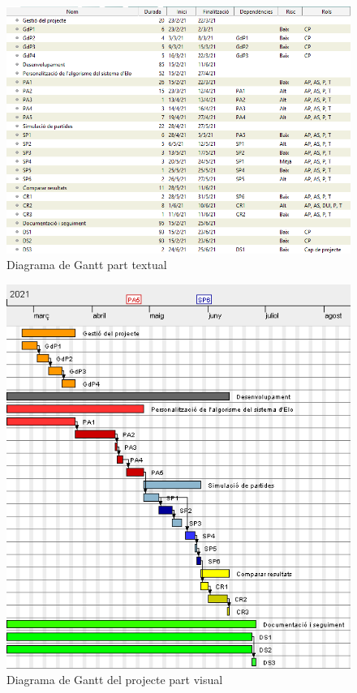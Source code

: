 \documentclass[a4paper]{article}
\begin{document}
\begin{figure}[H]
    \centering
    \includegraphics[width=1.15\textwidth]{images/GantEloEscrit.png}
    \caption{Diagrama de Gantt part textual}
    \label{fig:GanttText}
\end{figure}
 \newpage

        \begin{figure}[h!]
        \centering
            \includegraphics[width=1.05
            \textwidth]{images/GantElo.png}%
            \caption{Diagrama de Gantt del projecte part visual}
            \label{fig:GanttElo}
        \end{figure}
        
\end{document}
